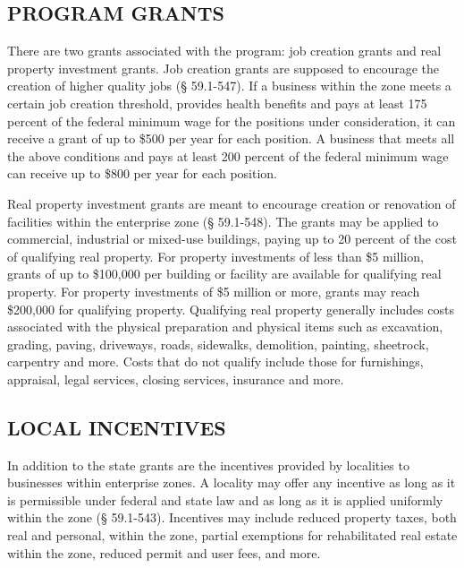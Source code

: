\documentclass[
]{book}
\begin{document}
\hypertarget{program-grants}{%
\subsection{PROGRAM GRANTS}\label{program-grants}}

There are two grants associated with the program: job creation grants and real property investment grants. Job creation grants are supposed to encourage the creation of higher quality jobs (§ 59.1-547). If a business within the zone meets a certain job creation threshold, provides health benefits and pays at least 175 percent of the federal minimum wage for the positions under consideration, it can receive a grant of up to \$500 per year for each position. A business that meets all the above conditions and pays at least 200 percent of the federal minimum wage can receive up to \$800 per year for each position.

Real property investment grants are meant to encourage creation or renovation of facilities within the enterprise zone (§ 59.1-548). The grants may be applied to commercial, industrial or mixed-use buildings, paying up to 20 percent of the cost of qualifying real property. For property investments of less than \$5 million, grants of up to \$100,000 per building or facility are available for qualifying real property. For property investments of \$5 million or more, grants may reach \$200,000 for qualifying property. Qualifying real property generally includes costs associated with the physical preparation and physical items such as excavation, grading, paving, driveways, roads, sidewalks, demolition, painting, sheetrock, carpentry and more. Costs that do not qualify include those for furnishings, appraisal, legal services, closing services, insurance and more.

\hypertarget{local-incentives}{%
\subsection{LOCAL INCENTIVES}\label{local-incentives}}

In addition to the state grants are the incentives provided by localities to businesses within enterprise zones. A locality may offer any incentive as long as it is permissible under federal and state law and as long as it is applied uniformly within the zone (§ 59.1-543). Incentives may include reduced property taxes, both real and personal, within the zone, partial exemptions for rehabilitated real estate within the zone, reduced permit and user fees, and more.
\end{document}
